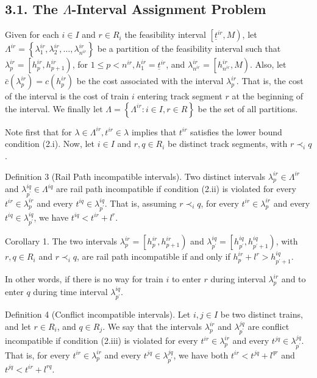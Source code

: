 \documentclass[10pt]{article}
\begin{document}
\subsection*{3.1. The $\Lambda$-Interval Assignment Problem}
Given for each $i \in I$ and $r \in R_{i}$ the feasibility interval $\left[\underline{t}^{i r}, M\right)$, let $\Lambda^{i r}=\left\{\lambda_{1}^{i r}, \lambda_{2}^{i r}, \ldots, \lambda_{n^{i r}}^{i r}\right\}$ be a partition of the feasibility interval such that\\
$\lambda_{p}^{i r}=\left[h_{p}^{i r}, h_{p+1}^{i r}\right)$, for $1 \leq p<n^{i r}, h_{1}^{i r}=\underline{t}^{i r}$, and $\lambda_{n^{i r}}^{i r}=\left[h_{n^{i r}}^{i r}, M\right)$. Also, let $\bar{c}\left(\lambda_{p}^{i r}\right)=c\left(h_{p}^{i r}\right)$ be the cost associated with the interval $\lambda_{p}^{i r}$. That is, the cost of the interval is the cost of train $i$ entering track segment $r$ at the beginning of the interval. We finally let $\Lambda=\left\{\Lambda^{i r}: i \in I, r \in R\right\}$ be the set of all partitions.

Note first that for $\lambda \in \Lambda^{i r}, t^{i r} \in \lambda$ implies that $t^{i r}$ satisfies the lower bound condition (2.i). Now, let $i \in I$ and $r, q \in R_{i}$ be distinct track segments, with $r \prec_{i} q$.

Definition 3 (Rail Path incompatible intervals). Two distinct intervals $\lambda_{p}^{i r} \in \Lambda^{i r}$ and $\lambda_{p^{\prime}}^{i q} \in \Lambda^{i q}$ are rail path incompatible if condition (2.ii) is violated for every $t^{i r} \in \lambda_{p}^{i r}$ and every $t^{i q} \in \lambda_{p^{\prime}}^{i q}$. That is, assuming $r \prec_{i} q$, for every $t^{i r} \in \lambda_{p}^{i r}$ and every $t^{i q} \in \lambda_{p^{\prime}}^{i q}$, we have $t^{i q}<t^{i r}+l^{r}$.

Corollary 1. The two intervals $\lambda_{p}^{i r}=\left[h_{p}^{i r}, h_{p+1}^{i r}\right)$ and $\lambda_{p^{\prime}}^{i q}=\left[h_{p^{\prime}}^{i q}, h_{p^{\prime}+1}^{i q}\right)$, with $r, q \in R_{i}$ and $r \prec_{i} q$, are rail path incompatible if and only if $h_{p}^{i r}+l^{r}>h_{p^{\prime}+1}^{i q}$.

In other words, if there is no way for train $i$ to enter $r$ during interval $\lambda_{p}^{i r}$ and to enter $q$ during time interval $\lambda_{p^{\prime}}^{i q}$.

Definition 4 (Conflict incompatible intervals). Let $i, j \in I$ be two distinct trains, and let $r \in R_{i}$, and $q \in R_{j}$. We say that the intervals $\lambda_{p}^{i r}$ and $\lambda_{p^{\prime}}^{j q}$ are conflict incompatible if condition (2.iii) is violated for every $t^{i r} \in \lambda_{p}^{i r}$ and every $t^{j q} \in \lambda_{p^{\prime}}^{j q}$. That is, for every $t^{i r} \in \lambda_{p}^{i r}$ and every $t^{j q} \in \lambda_{p^{\prime}}^{j q}$, we have both $t^{i r}<t^{j q}+l^{q r}$ and $t^{j q}<t^{i r}+l^{r q}$.
\end{document}
